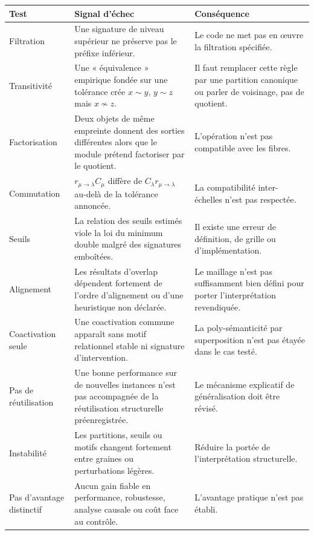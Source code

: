 \documentclass[11pt,a4paper]{article}
\theoremstyle{remark}
\begin{document}
\begin{longtable}{p{}p{}p{}}
\toprule
\textbf{Test} & \textbf{Signal d'échec} & \textbf{Conséquence}\\
\midrule
Filtration & Une signature de niveau supérieur ne préserve pas le préfixe inférieur. & Le code ne met pas en œuvre la filtration spécifiée.\\
Transitivité & Une « équivalence » empirique fondée sur une tolérance crée $x\sim y$, $y\sim z$ mais $x\not\sim z$. & Il faut remplacer cette règle par une partition canonique ou parler de voisinage, pas de quotient.\\
Factorisation & Deux objets de même empreinte donnent des sorties différentes alors que le module prétend factoriser par le quotient. & L'opération n'est pas compatible avec les fibres.\\
Commutation & $r_{\mu\to\lambda}C_\mu$ diffère de $C_\lambda r_{\mu\to\lambda}$ au-delà de la tolérance annoncée. & La compatibilité inter-échelles n'est pas respectée.\\
Seuils & La relation des seuils estimés viole la loi du minimum double malgré des signatures emboîtées. & Il existe une erreur de définition, de grille ou d'implémentation.\\
Alignement & Les résultats d'overlap dépendent fortement de l'ordre d'alignement ou d'une heuristique non déclarée. & Le maillage n'est pas suffisamment bien défini pour porter l'interprétation revendiquée.\\
Coactivation seule & Une coactivation commune apparaît sans motif relationnel stable ni signature d'intervention. & La poly-sémanticité par superposition n'est pas étayée dans le cas testé.\\
Pas de réutilisation & Une bonne performance sur de nouvelles instances n'est pas accompagnée de la réutilisation structurelle préenregistrée. & Le mécanisme explicatif de généralisation doit être révisé.\\
Instabilité & Les partitions, seuils ou motifs changent fortement entre graines ou perturbations légères. & Réduire la portée de l'interprétation structurelle.\\
Pas d'avantage distinctif & Aucun gain fiable en performance, robustesse, analyse causale ou coût face au contrôle. & L'avantage pratique n'est pas établi.\\
\bottomrule
\end{longtable}
\end{document}
